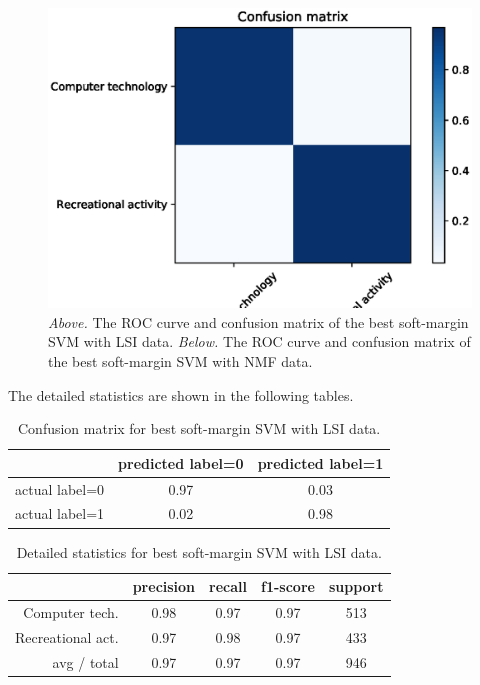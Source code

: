 \documentclass[letterpaper]{article}
\begin{document}
\begin{figure}[!htb]
\begin{minipage}{0.5\textwidth}
\end{minipage}%
\begin{minipage}{0.5\textwidth}
\includegraphics[width=1.0\textwidth]{conf-mat-nmf-svm-train}
\end{minipage}
\caption{\emph{Above.} The ROC curve and confusion matrix
of the best soft-margin SVM with LSI data.
\emph{Below.} The ROC curve and confusion matrix of the best soft-margin SVM
with NMF data.}
\label{fig:svm-train-2}
\end{figure}

The detailed statistics are shown in the following tables.
\begin{table}[H]
\centering
\begin{tabular}{c|cc}
 & predicted label=0 & predicted label=1 \\ \hline
actual label=0 & 0.97 & 0.03 \\
actual label=1 & 0.02 & 0.98 \\
\end{tabular}
\caption{Confusion matrix for best soft-margin SVM with LSI data.}
\end{table}

\begin{table}[H]
\centering
\begin{tabular}{r|cccc}
 & precision & recall & f1-score & support \\ \hline
Computer tech. & 0.98 & 0.97 & 0.97 & 513 \\
Recreational act. & 0.97 & 0.98 & 0.97 & 433 \\
avg / total & 0.97 & 0.97 & 0.97 & 946 \\
\end{tabular}
\caption{Detailed statistics for best soft-margin SVM with LSI data.}
\end{table}
\end{document}
